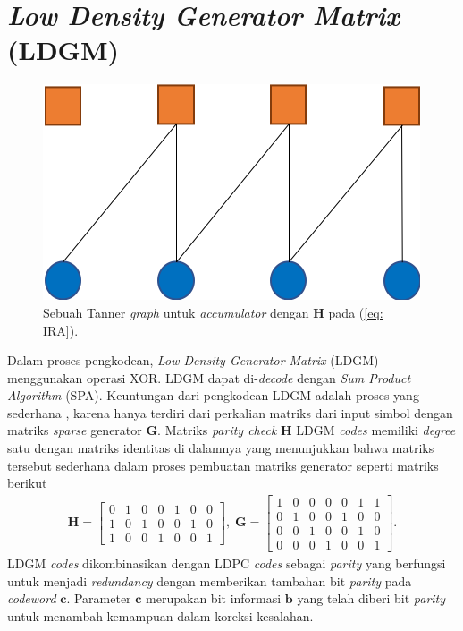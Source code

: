 \section{\textit{Low Density Generator Matrix} (LDGM)}
\begin{figure}[b!]
	\centering
	\includegraphics[scale=0.75]
	{pics/ira.png}
	\caption{Sebuah Tanner \textit{graph} untuk \textit{accumulator} dengan $\mathbf{H}$ pada (\ref{eq: IRA}).}
	\label{fig:ira codes}
\end{figure}
Dalam proses pengkodean, \textit{Low Density Generator Matrix} (LDGM) menggunakan operasi XOR. LDGM dapat di-\textit{decode} dengan \textit{Sum Product Algorithm} (SPA). Keuntungan dari pengkodean LDGM adalah proses yang sederhana \cite{LDGM}, karena hanya terdiri dari perkalian matriks dari input simbol dengan matriks \textit{sparse} generator $\mathbf{G}$. Matriks \textit{parity check} $\mathbf{H}$ LDGM \textit{codes} memiliki \textit{degree} satu dengan matriks identitas di dalamnya yang menunjukkan bahwa matriks tersebut sederhana dalam proses pembuatan matriks generator seperti matriks berikut
\begin{eqnarray}
\mathbf{H}=\begin{bmatrix}
0 & 1 & 0 & 0 & 1 & 0 & 0\\
1 & 0 & 1 & 0 & 0 & 1 & 0\\
1 & 0 & 0 & 1 & 0 & 0 & 1
\end{bmatrix}, \;
\mathbf{G}=\begin{bmatrix}
1 & 0 & 0 & 0 & 0 & 1 & 1\\
0 & 1 & 0 & 0 & 1 & 0 & 0\\
0 & 0 & 1 & 0 & 0 & 1 & 0\\
0 & 0 & 0 & 1 & 0 & 0 & 1
\end{bmatrix}.
\end{eqnarray}
LDGM \textit{codes} dikombinasikan dengan LDPC \textit{codes} sebagai \textit{parity} yang berfungsi untuk menjadi \textit{redundancy} dengan memberikan tambahan bit \textit{parity} pada \textit{codeword} $\mathbf{c}$. Parameter $\mathbf{c}$ merupakan bit informasi $\mathbf{b}$ yang telah diberi bit \textit{parity} untuk menambah kemampuan dalam koreksi kesalahan. 

